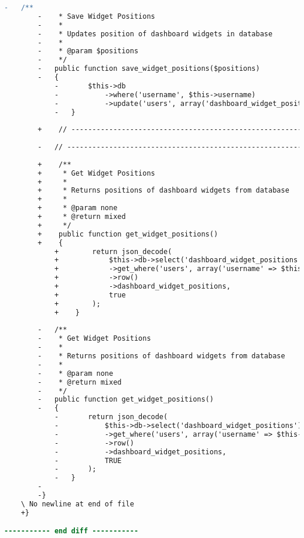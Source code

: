\begin{lstlisting}[language=diff, caption=Perubahan pada kode User.php]
		-	/**
		-	 * Save Widget Positions
		-	 *
		-	 * Updates position of dashboard widgets in database
		-	 *
		-	 * @param $positions
		-	 */
		-	public function save_widget_positions($positions)
		-	{
			-		$this->db
			-			->where('username', $this->username)
			-			->update('users', array('dashboard_widget_positions'=>$positions));
			-	}
		
		+    // ------------------------------------------------------------------------
		
		-	// ------------------------------------------------------------------------
		
		+    /**
		+     * Get Widget Positions
		+     *
		+     * Returns positions of dashboard widgets from database
		+     *
		+     * @param none
		+     * @return mixed
		+     */
		+    public function get_widget_positions()
		+    {
			+        return json_decode(
			+            $this->db->select('dashboard_widget_positions')
			+            ->get_where('users', array('username' => $this->username))
			+            ->row()
			+            ->dashboard_widget_positions,
			+            true
			+        );
			+    }
		
		-	/**
		-	 * Get Widget Positions
		-	 *
		-	 * Returns positions of dashboard widgets from database
		-	 *
		-	 * @param none
		-	 * @return mixed
		-	 */
		-	public function get_widget_positions()
		-	{
			-		return json_decode(
			-			$this->db->select('dashboard_widget_positions')
			-			->get_where('users', array('username' => $this->username))
			-			->row()
			-			->dashboard_widget_positions,
			-			TRUE
			-		);
			-	}
		-
		-}
	\ No newline at end of file
	+}

----------- end diff -----------
\end{lstlisting}


